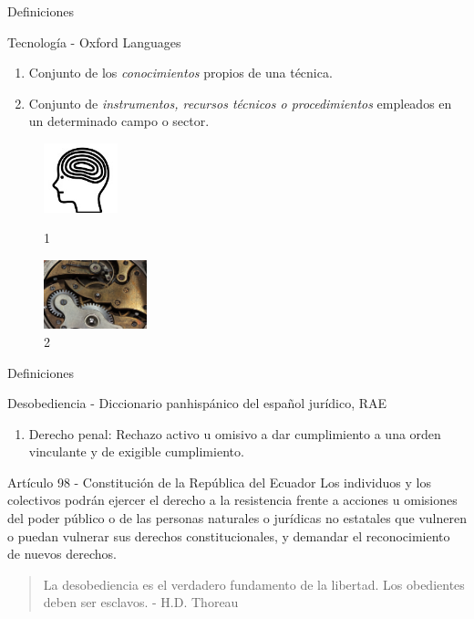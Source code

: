 \documentclass[spanish]{beamer}
\begin{document}
\begin{frame}{Definiciones}
    \begin{block}{Tecnología - Oxford Languages}
        \begin{enumerate}
            \item Conjunto de los \emph{conocimientos} propios de una técnica.
            \item Conjunto de \emph{instrumentos, recursos técnicos o procedimientos} empleados en un determinado campo o sector.
        \end{enumerate}
    \end{block}
    \begin{figure}[htb!]
            \hspace*{1.5cm}\includegraphics[height=2cm]{img/mind.jpg}\caption{ 1}
        \endminipage\hfill
            \hspace*{1.5cm}\includegraphics[height=2cm]{img/clockwork.jpg}\caption{ 2}
        \endminipage\hfill
    \end{figure}
\end{frame}
\begin{frame}{Definiciones}
    \begin{block}{Desobediencia - Diccionario panhispánico del español jurídico, RAE}
        \begin{enumerate}
            \item Derecho penal: Rechazo activo u omisivo a dar cumplimiento a una orden vinculante y de exigible cumplimiento.
        \end{enumerate}
    \end{block}
    \begin{block}{Artículo 98 - Constitución de la República del Ecuador}
        Los individuos y los colectivos podrán ejercer el derecho a la resistencia frente a acciones u omisiones del poder público o de las personas naturales o jurídicas no estatales que vulneren o puedan vulnerar sus derechos constitucionales, y demandar el reconocimiento de nuevos derechos.
    \end{block}
\end{frame}
\begin{frame}{}
    \begin{quote}
        La desobediencia es el verdadero fundamento de la libertad. Los obedientes deben ser esclavos. - H.D. Thoreau
    \end{quote}
\end{frame}
\end{document}
